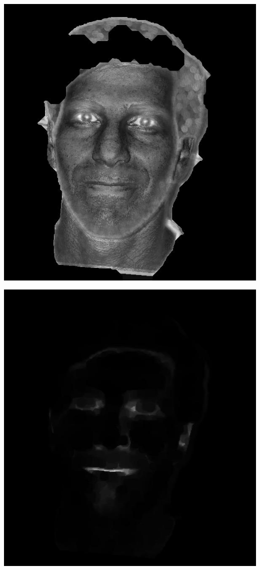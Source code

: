 \begin{Figure}
  \centering
    \includegraphics[width=0.5\columnwidth]{im9_eye.jpg}
\end{Figure}

\begin{Figure}
  \centering
    \includegraphics[width=0.5\columnwidth]{im9_mouth.jpg}
\end{Figure}


